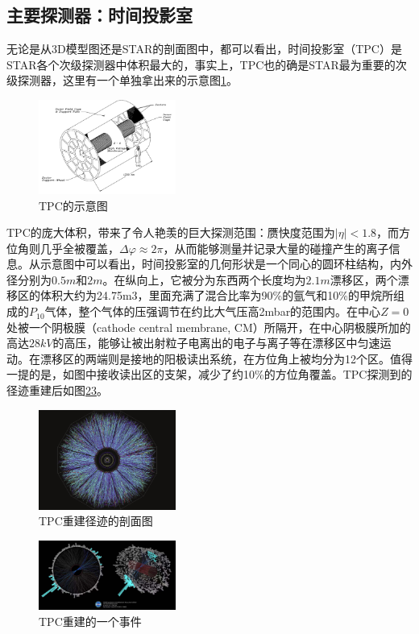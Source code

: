 \documentclass[%
 reprint,
 amsmath,amssymb,
 aps,
]{revtex4-1}
\begin{document}
\subsection{\label{sec:TPC}主要探测器：时间投影室}
无论是从3D模型图还是STAR的剖面图中，都可以看出，时间投影室（TPC）是STAR各个次级探测器中体积最大的，事实上，TPC也的确是STAR最为重要的次级探测器，这里有一个单独拿出来的示意图\ref{fig:TPC}。
\begin{figure}[htbp]
    \includegraphics[width = 0.4\textwidth]{Plots/TPC.png}
    \caption{\label{fig:TPC}TPC的示意图}
\end{figure}

TPC的庞大体积，带来了令人艳羡的巨大探测范围：赝快度范围为$|\eta|<1.8$，而方位角则几乎全被覆盖，$\Delta\varphi \approx 2\pi$，从而能够测量并记录大量的碰撞产生的离子信息。从示意图中可以看出，时间投影室的几何形状是一个同心的圆环柱结构，内外径分别为$0.5\si{m}$和$2\si{m}$。在纵向上，它被分为东西两个长度均为$2.1\si{m}$漂移区，两个漂移区的体积大约为24.75m3，里面充满了混合比率为90\%的氩气和10\%的甲烷所组成的$P_{10}$气体，整个气体的压强调节在约比大气压高2mbar的范围内。在中心$Z=0$处被一个阴极膜（cathode central membrane, CM）所隔开，在中心阴极膜所加的高达$28\si{kV}$的高压，能够让被出射粒子电离出的电子与离子等在漂移区中匀速运动。在漂移区的两端则是接地的阳极读出系统，在方位角上被均分为12个区。值得一提的是，如图中接收读出区的支架，减少了约10\%的方位角覆盖。TPC探测到的径迹重建后如图\ref{fig:Eye}\ref{fig:event}。
\begin{figure}[htbp]
    \includegraphics[width=0.4\textwidth]{Plots/Eye.png}
    \caption{\label{fig:Eye}TPC重建径迹的剖面图}
\end{figure}
\begin{figure}[htbp]
    \includegraphics[width=0.4\textwidth]{Plots/event.jpg}
    \caption{\label{fig:event}TPC重建的一个事件}
\end{figure}
\end{document}
